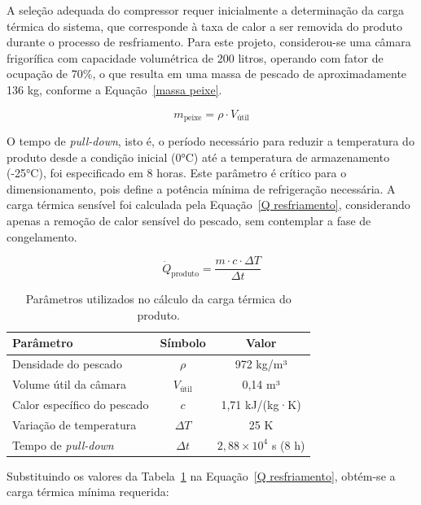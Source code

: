 A seleção adequada do compressor requer inicialmente a determinação da carga térmica do sistema, que corresponde à taxa de calor a ser removida do produto durante o processo de resfriamento. Para este projeto, considerou-se uma câmara frigorífica com capacidade volumétrica de 200 litros, operando com fator de ocupação de 70\%, o que resulta em uma massa de pescado de aproximadamente 136 kg, conforme a Equação~\ref{massa peixe}.

\begin{equation}
    m_{\text{peixe}} = \rho \cdot V_{\text{útil}}
    \label{massa peixe}
\end{equation}

O tempo de \textit{pull-down}, isto é, o período necessário para reduzir a temperatura do produto desde a condição inicial (0°C) até a temperatura de armazenamento (-25°C), foi especificado em 8 horas. Este parâmetro é crítico para o dimensionamento, pois define a potência mínima de refrigeração necessária. A carga térmica sensível foi calculada pela Equação~\ref{Q resfriamento}, considerando apenas a remoção de calor sensível do pescado, sem contemplar a fase de congelamento.

\begin{equation}
    \dot{Q}_{\text{produto}} = \frac{m \cdot c \cdot \Delta T}{\Delta t}
    \label{Q resfriamento}
\end{equation}

\begin{table}[ht]
\centering
\begin{tabular}{|l|c|c|}
\hline
\textbf{Parâmetro} & \textbf{Símbolo} & \textbf{Valor} \\ \hline
Densidade do pescado & $\rho$ & 972 kg/m³ \\ \hline
Volume útil da câmara & $V_{\text{útil}}$ & 0,14 m³ \\ \hline
Calor específico do pescado & $c$ & 1,71 kJ/(kg·K) \\ \hline
Variação de temperatura & $\Delta T$ & 25 K \\ \hline
Tempo de \textit{pull-down} & $\Delta t$ & $2,88 \times 10^{4}$ s (8 h) \\ \hline
\end{tabular}
\caption{Parâmetros utilizados no cálculo da carga térmica do produto.}
\label{tab:tabela dados}
\end{table}

Substituindo os valores da Tabela~\ref{tab:tabela dados} na Equação~\ref{Q resfriamento}, obtém-se a carga térmica mínima requerida:

